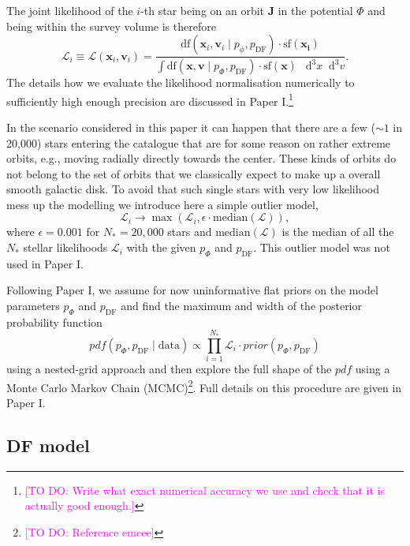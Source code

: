 \documentclass[iop,revtex4,numberedappendix,appendixfloats]{emulateapj}
\newcommand{\vect}[1]{\boldsymbol{#1}}
\newcommand*\Diff[1]{\mathop{}\!\mathrm{d^#1}}
\newcommand{\pdf}{\ensuremath{pdf}}
\newcommand{\Wilma}[1]{\textcolor{Magenta}{#1}}
\begin{document}
The joint likelihood of the $i$-th star being on an orbit $\vect{J}$ in the potential $\Phi$ and being within the survey volume is therefore
\begin{equation*}
\mathscr{L}_i \equiv \mathscr{L}(\vect{x}_i,\vect{v}_i) = \frac{\text{df}(\vect{x}_i,\vect{v}_i\mid p_\phi, p_\text{DF}) \cdot \text{sf}(\vect{x_i})}{\int \text{df}(\vect{x},\vect{v}\mid p_\Phi, p_\text{DF}) \cdot \text{sf}(\vect{x}) \ \Diff3 x \Diff3 v}.
\end{equation*}
The details how we evaluate the likelihood normalisation numerically to sufficiently high enough precision are discussed in Paper I.\footnote{\Wilma{[TO DO: Write what exact numerical accuracy we use and check that it is actually good enough.]}}

In the scenario considered in this paper it can happen that there are a few ($\sim 1$ in 20,000) stars entering the catalogue that are for some reason  on rather extreme orbits, e.g., moving radially directly towards the center. These kinds of orbits do not belong to the set of orbits that we classically expect to make up a overall smooth galactic disk. To avoid that such single stars with very low likelihood mess up the modelling we introduce here a simple outlier model,
\begin{equation*}
\mathscr{L}_i \longrightarrow \max \left( \mathscr{L}_i, \epsilon \cdot \text{median}(\mathscr{L})\right),
\end{equation*}
where $\epsilon = 0.001$ for $N_*=20,000$ stars and $\text{median}(\mathscr{L})$ is the median of all the $N_*$ stellar likelihoods $\mathscr{L}_i$ with the given $p_\Phi$ and $p_\text{DF}$. This outlier model was not used in Paper I.

Following Paper I, we assume for now uninformative flat priors on the model parameters $p_\Phi$ and $p_\text{DF}$ and find the maximum and width of the posterior probability function
\begin{equation*}
pdf(p_\Phi,p_\text{DF} \mid \text{data}) \propto \prod_{i=1}^{N_*} \mathscr{L}_i \cdot prior(p_\Phi,p_\text{DF})
\end{equation*}
using a nested-grid approach and then explore the full shape of the $\pdf$ using a Monte Carlo Markov Chain (MCMC)\footnote{\Wilma{[TO DO: Reference emcee]}}. Full details on this procedure are given in Paper I.

\subsection{DF model} \label{sec:DF_model}
\end{document}
